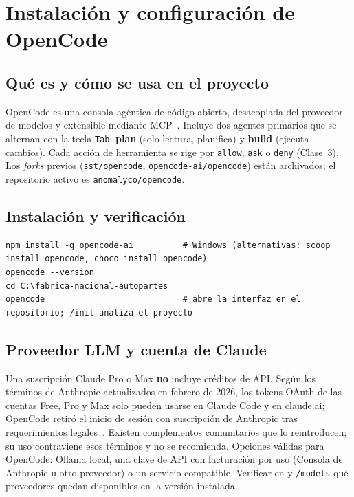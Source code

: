 \chapter{Instalación y configuración de OpenCode}\label{cap:opencode}

\section{Qué es y cómo se usa en el proyecto}
OpenCode es una consola agéntica de código abierto, desacoplada del proveedor de modelos y extensible mediante
MCP~\cite{opencode}. Incluye dos agentes primarios que se alternan con la tecla \texttt{Tab}: \textbf{plan}
(solo lectura, planifica) y \textbf{build} (ejecuta cambios). Cada acción de herramienta se rige por
\texttt{allow}, \texttt{ask} o \texttt{deny} (Clase~3). Los \emph{forks} previos (\texttt{sst/opencode},
\texttt{opencode-ai/opencode}) están archivados; el repositorio activo es \texttt{anomalyco/opencode}.

\section{Instalación y verificación}
\begin{lstlisting}[style=ps]
npm install -g opencode-ai          # Windows (alternativas: scoop install opencode, choco install opencode)
opencode --version
cd C:\fabrica-nacional-autopartes
opencode                            # abre la interfaz en el repositorio; /init analiza el proyecto
\end{lstlisting}

\section{Proveedor LLM y cuenta de Claude}\label{sec:proveedor-opencode}
\begin{nota}
Una suscripción Claude Pro o Max \textbf{no} incluye créditos de API. Según los términos de Anthropic
actualizados en febrero de 2026, los tokens OAuth de las cuentas Free, Pro y Max solo pueden usarse en Claude
Code y en claude.ai; OpenCode retiró el inicio de sesión con suscripción de Anthropic tras requerimientos
legales~\cite{register-anthropic}. Existen complementos comunitarios que lo reintroducen; su uso contraviene esos
términos y no se recomienda. Opciones válidas para OpenCode: Ollama local, una clave de API con facturación por
uso (Consola de Anthropic u otro proveedor) o un servicio compatible. Verificar en  y
\texttt{/models} qué proveedores quedan disponibles en la versión instalada.
\end{nota}

